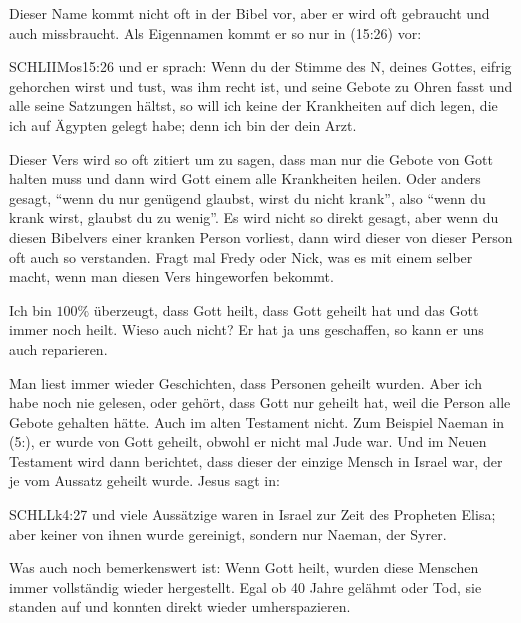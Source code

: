     \begin{otsblock}
        Dieser Name kommt nicht oft in der Bibel vor, aber er wird oft gebraucht und auch missbraucht. Als Eigennamen kommt er so nur in (15:26) vor:
        \begin{bibelbox}{SCHL}{IIMos}{15:26}
            und er sprach: Wenn du der Stimme des \herr N, deines Gottes, eifrig gehorchen wirst und tust, was ihm recht ist, und seine Gebote zu Ohren fasst und alle seine Satzungen hältst, so will ich keine der Krankheiten auf dich legen, die ich auf Ägypten gelegt habe; denn ich bin der \herr{} dein Arzt.
        \end{bibelbox}
        
        Dieser Vers wird so oft zitiert um zu sagen, dass man nur die Gebote von Gott halten muss und dann wird Gott einem alle Krankheiten heilen. Oder anders gesagt, \enquote{wenn du nur genügend glaubst, wirst du nicht krank}, also \enquote{wenn du krank wirst, glaubst du zu wenig}. Es wird nicht so direkt gesagt, aber wenn du diesen Bibelvers einer kranken Person vorliest, dann wird dieser von dieser Person oft auch so verstanden. Fragt mal Fredy oder Nick, was es mit einem selber macht, wenn man diesen Vers hingeworfen bekommt.

        Ich bin $100\%$ überzeugt, dass Gott heilt, dass Gott geheilt hat und das Gott immer noch heilt. Wieso auch nicht? Er hat ja uns geschaffen, so kann er uns auch reparieren. 
        
        Man liest immer wieder Geschichten, dass Personen geheilt wurden. Aber ich habe noch nie gelesen, oder gehört, dass Gott nur geheilt hat, weil die Person alle Gebote gehalten hätte. Auch im alten Testament nicht. Zum Beispiel Naeman in (5:), er wurde von Gott geheilt, obwohl er nicht mal Jude war. Und im Neuen Testament wird dann berichtet, dass dieser der einzige Mensch in Israel war, der je vom Aussatz geheilt wurde. Jesus sagt in:
        \begin{bibelbox}{SCHL}{Lk}{4:27}
            und viele Aussätzige waren in Israel zur Zeit des Propheten Elisa; aber keiner von ihnen wurde gereinigt, sondern nur Naeman, der Syrer.
        \end{bibelbox}

        Was auch noch bemerkenswert ist: Wenn Gott heilt, wurden diese Menschen immer vollständig wieder hergestellt. Egal ob 40 Jahre gelähmt oder Tod, sie standen auf und konnten direkt wieder umherspazieren.


\end{otsblock}

